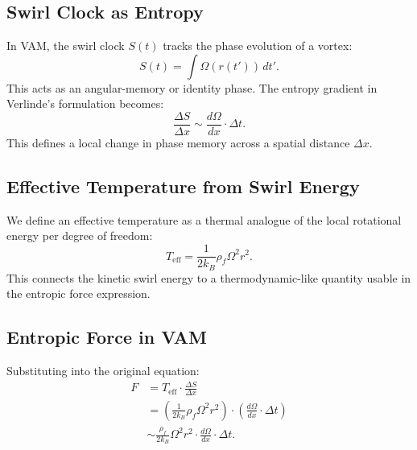 \documentclass[preprint]{revtex4-2}
\begin{document}
            \subsection{Swirl Clock as Entropy}
            In VAM, the swirl clock $S(t)$ tracks the phase evolution of a vortex:
            \begin{equation}
                S(t) = \int \Omega(r(t'))\, dt'.
            \end{equation}
            This acts as an angular-memory or identity phase. The entropy gradient in Verlinde's formulation becomes:
            \begin{equation}
                \frac{\Delta S}{\Delta x} \sim \frac{d\Omega}{dx} \cdot \Delta t.
            \end{equation}
            This defines a local change in phase memory across a spatial distance $\Delta x$.

            \subsection*{Effective Temperature from Swirl Energy}
            We define an effective temperature as a thermal analogue of the local rotational energy per degree of freedom:
            \begin{equation}
                T_\text{eff} = \frac{1}{2k_B} \rho_{\scriptscriptstyle\boldsymbol\!f} \Omega^2 r^2.
            \end{equation}
            This connects the kinetic swirl energy to a thermodynamic-like quantity usable in the entropic force expression.

            \subsection{Entropic Force in VAM}
            Substituting into the original equation:
            \begin{align}
                F &= T_\text{eff} \cdot \frac{\Delta S}{\Delta x} \\
                  &= \left( \frac{1}{2k_B} \rho_{\scriptscriptstyle\boldsymbol\!f} \Omega^2 r^2 \right) \cdot \left( \frac{d\Omega}{dx} \cdot \Delta t \right) \\
                  &\sim \frac{\rho_{\scriptscriptstyle\boldsymbol\!f}}{2k_B} \Omega^2 r^2 \cdot \frac{d\Omega}{dx} \cdot \Delta t.
            \end{align}
\end{document}
